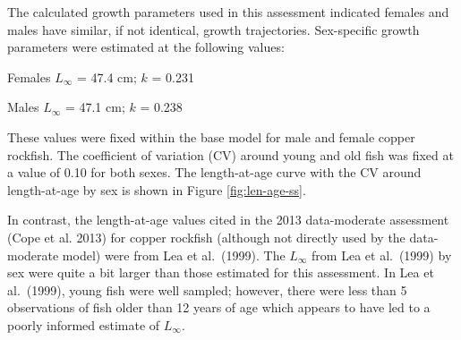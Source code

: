 \documentclass[11pt,
  english,
  a4paper,
]{article}
\begin{document}
\leavevmode\tagmcend\tagstructend\par


The calculated growth parameters used in this assessment indicated females and males have similar, if not identical, growth trajectories. Sex-specific growth parameters were estimated at the following values:

\leavevmode\tagmcend\tagstructend\par

\begin{centering}

Females $L_{\infty}$ = 47.4 cm; $k$ = 0.231

Males $L_{\infty}$ = 47.1 cm; $k$ = 0.238

\end{centering}

\vspace{0.75cm}


These values were fixed within the base model for male and female copper rockfish. The coefficient of variation (CV) around young and old fish was fixed at a value of 0.10 for both sexes. The length-at-age curve with the CV around length-at-age by sex is shown in Figure \ref{fig:len-age-ss}.

\leavevmode\tagmcend\tagstructend\par


In contrast, the length-at-age values cited in the 2013 data-moderate assessment {(Cope et al. 2013)\leavevmode\tagmcend\tagstructend} for copper rockfish (although not directly used by the data-moderate model) were from Lea et al.~{(1999)\leavevmode\tagmcend\tagstructend}. The {\(L_{\infty}\)\leavevmode\tagmcend\tagstructend} from Lea et al.~{(1999)\leavevmode\tagmcend\tagstructend} by sex were quite a bit larger than those estimated for this assessment. In Lea et al.~{(1999)\leavevmode\tagmcend\tagstructend}, young fish were well sampled; however, there were less than 5 observations of fish older than 12 years of age which appears to have led to a poorly informed estimate of {\(L_{\infty}\)\leavevmode\tagmcend\tagstructend}.
\end{document}
